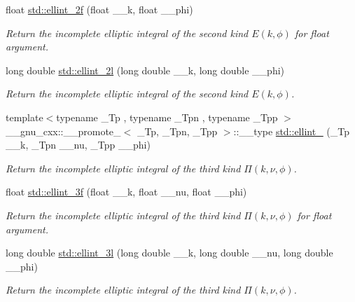 \begin{DoxyCompactItemize}
float \hyperlink{group__tr29124__math__spec__func_ga594a730163c6228c75b152462700062b}{std\+::ellint\+\_\+2f} (float \+\_\+\+\_\+k, float \+\_\+\+\_\+phi)
\begin{DoxyCompactList}\small\item\em Return the incomplete elliptic integral of the second kind $ E(k,\phi) $ for {\ttfamily float} argument. \end{DoxyCompactList}\item 
long double \hyperlink{group__tr29124__math__spec__func_ga5c791332d374a809d8ca16c69a1a30f5}{std\+::ellint\+\_\+2l} (long double \+\_\+\+\_\+k, long double \+\_\+\+\_\+phi)
\begin{DoxyCompactList}\small\item\em Return the incomplete elliptic integral of the second kind $ E(k,\phi) $. \end{DoxyCompactList}\item 
{\footnotesize template$<$typename \+\_\+\+Tp , typename \+\_\+\+Tpn , typename \+\_\+\+Tpp $>$ }\\\+\_\+\+\_\+gnu\+\_\+cxx\+::\+\_\+\+\_\+promote\+\_$<$ \+\_\+\+Tp, \+\_\+\+Tpn, \+\_\+\+Tpp $>$\+::\+\_\+\+\_\+type \hyperlink{group__tr29124__math__spec__func_ga20832e3a67d25cc3d415cafc88019ac3}{std\+::ellint\+\_} (\+\_\+\+Tp \+\_\+\+\_\+k, \+\_\+\+Tpn \+\_\+\+\_\+nu, \+\_\+\+Tpp \+\_\+\+\_\+phi)
\begin{DoxyCompactList}\small\item\em Return the incomplete elliptic integral of the third kind $ \Pi(k,\nu,\phi) $. \end{DoxyCompactList}\item 
float \hyperlink{group__tr29124__math__spec__func_ga1a80bd2c15bc9fbecda2630a9e9409e7}{std\+::ellint\+\_\+3f} (float \+\_\+\+\_\+k, float \+\_\+\+\_\+nu, float \+\_\+\+\_\+phi)
\begin{DoxyCompactList}\small\item\em Return the incomplete elliptic integral of the third kind $ \Pi(k,\nu,\phi) $ for {\ttfamily float} argument. \end{DoxyCompactList}\item 
long double \hyperlink{group__tr29124__math__spec__func_gaa8c0e5864df8769021a7f3e21a30c5d2}{std\+::ellint\+\_\+3l} (long double \+\_\+\+\_\+k, long double \+\_\+\+\_\+nu, long double \+\_\+\+\_\+phi)
\begin{DoxyCompactList}\small\item\em Return the incomplete elliptic integral of the third kind $ \Pi(k,\nu,\phi) $. \end{DoxyCompactList}\item 

\end{DoxyCompactItemize}
